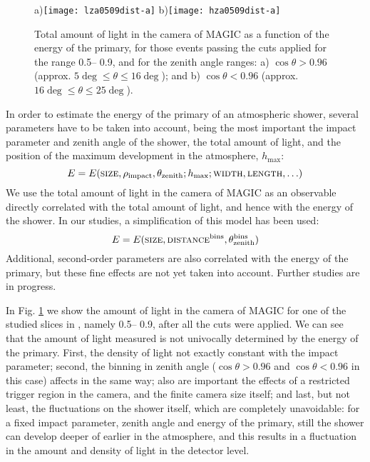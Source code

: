 \begin{figure}[t]
\centering
a)\texttt{[image: lza0509dist-a]}
\hfil
b)\texttt{[image: hza0509dist-a]}
\caption{\label{logSIZElogE:fig}
  Total amount of light in the camera of MAGIC as a function of the
  energy of the primary, for those events passing the cuts applied for
  the \DISTANCE range 0.5\deg -- 0.9\deg, and for the zenith angle
  ranges: a) $\cos\theta>0.96$ (approx.  $5\deg \leq \theta \leq
  16\deg$); and b) $\cos\theta<0.96$ (approx. $16\deg \leq \theta \leq
  25\deg$).}  \vskip -15pt
\end{figure}

In order to estimate the energy of the primary of an atmospheric
shower, several parameters have to be taken into account, being the
most important the impact parameter and zenith angle of the shower,
the total amount of light, and the position of the maximum development
in the atmosphere, $h_{\mathrm{max}}$:
%
\begin{equation}
E = E(\mbox{\scshape size}, \rho_{\mathrm{impact}},
\theta_{\mathrm{zenith}}; h_{\mathrm{max}}; \mbox{\scshape width}, \mbox{\scshape length}, \ldots)
\end{equation}
%
We use the total amount of light in the camera of MAGIC as an
observable directly correlated with the total amount of light, and
hence with the energy of the shower. In our studies, a simplification
of this model has been used:
%
\begin{equation}
E = E(\mbox{\scshape size}, \mbox{\scshape distance}^{\mathrm{bins}},
\theta_{\mathrm{zenith}}^{\mathrm{bins}})
\label{simple.eq}
\end{equation}
%
Additional, second-order parameters are also correlated with the
energy of the primary, but these fine effects are not yet taken into
account. Further studies are in progress.

In Fig. \ref{logSIZElogE:fig} we show the amount of light in the
camera of MAGIC for one of the studied slices in \DISTANCE, namely
0.5\deg -- 0.9\deg, after all the cuts were applied.  We can see that
the amount of light measured is not univocally determined by the
energy of the primary. First, the density of light not exactly
constant with the impact parameter; second, the binning in zenith
angle ($\cos\theta>0.96$ and $\cos\theta<0.96$ in this case) affects
in the same way; also are important the effects of a restricted
trigger region in the camera, and the finite camera size itself; and
last, but not least, the fluctuations on the shower itself, which are
completely unavoidable: for a fixed impact parameter, zenith angle and
energy of the primary, still the shower can develop deeper of earlier
in the atmosphere, and this results in a fluctuation in the amount and
density of light in the detector level.

